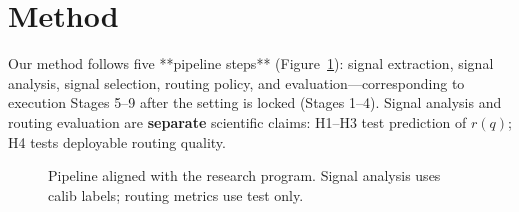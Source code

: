 \section{Method}
\label{sec:method}

Our method follows five **pipeline steps** (Figure~\ref{fig:pipeline}): signal extraction, signal analysis, signal selection, routing policy, and evaluation---corresponding to execution Stages 5--9 after the setting is locked (Stages 1--4).
Signal analysis and routing evaluation are \textbf{separate} scientific claims: H1--H3 test prediction of $r(q)$; H4 tests deployable routing quality.

\begin{figure}[t]
  \centering
  \caption{Pipeline aligned with the research program. Signal analysis uses calib labels; routing metrics use test only.}
  \label{fig:pipeline}
\end{figure}





